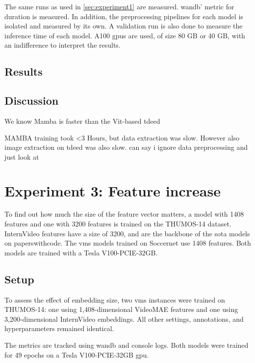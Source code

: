 The same runs as used in \autoref{sec:experiment1} are measured. \acrlong{wandb}' metric for duration is measured. In addition, the preprocessing pipelines for each model is isolated and measured by its own. A validation run is also done to measure the inference time of each model. A100 \acrshort{gpu}s are used, of size 80 GB or 40 GB, with an indifference to interpret the results. 

\subsection{Results}
\label{ssec:ex2_result}

\subsection{Discussion}
\label{ssec:ex2_discussion}

We know Mamba is faster than the Vit-based tdeed

MAMBA training took <3 Hours, but data extraction was slow. However also image extraction on tdeed was also slow. can say i ignore data preprocessing and just look at 


\section{Experiment 3: Feature increase}
\label{sec:experiment3}
To find out how much the size of the feature vector matters, a model with 1408 features and one with 3200 features is trained on the THUMOS-14 dataset.
InternVideo features have a size of 3200, and are the backbone of the \acrshort{sota} models on paperswithcode. The \acrshort{vms} models trained on Soccernet use 1408 features. Both models are trained with a Tesla V100-PCIE-32GB.


\subsection{Setup}
\label{ssec:ex3_setup}

To assess the effect of embedding size, two \acrshort{vms} instances were trained on THUMOS-14\cite{dataset:thumos}: one using 1,408-dimensional VideoMAE features and one using 3,200-dimensional InternVideo embeddings. All other settings, annotations, and hyperparameters remained identical.

The metrics are tracked using \acrlong{wandb} and console logs.
Both models were trained for 49 epochs on a Tesla V100-PCIE-32GB \acrshort{gpu}.

